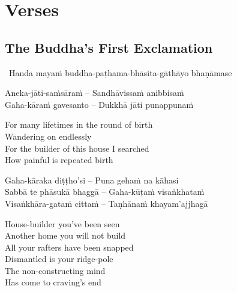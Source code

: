 \ifdesktopversion
{}
\else
{}
\fi

\chapter{Verses}

\section{The Buddha's First Exclamation}
\label{buddhas-first-exclamation}

\begin{leader}
  \anglebracketleft\ \hspace{-0.5mm}Handa mayaṁ buddha-paṭhama-bhāsita-gāthāyo bhaṇāmase \hspace{-0.5mm}\anglebracketright\
\end{leader}

\begin{verses}
  Aneka-jāti-saṁsāraṁ – Sandhāvissaṁ anibbisaṁ\\
  Gaha-kāraṁ gavesanto – Dukkhā jāti punappunaṁ
\end{verses}

\begin{english-verses}
  For many lifetimes in the round of birth\\
  Wandering on endlessly\\
  For the builder of this house I searched\\
  How painful is repeated birth
\end{english-verses}

\begin{verses}
  Gaha-kāraka diṭṭho'si – Puna gehaṁ na kāhasi\\
  Sabbā te phāsukā bhaggā – Gaha-kūṭaṁ visaṅkhataṁ\\
  Visaṅkhāra-gataṁ cittaṁ – Taṇhānaṁ khayam'ajjhagā
\end{verses}

\begin{english-verses}
  House-builder you've been seen\\
  Another home you will not build\\
  All your rafters have been snapped\\
  Dismantled is your ridge-pole\\
  The non-constructing mind\\
  Has come to craving's end
\end{english-verses}

